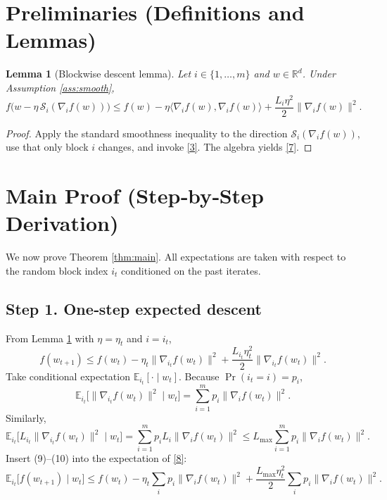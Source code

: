 \documentclass{article}
\newtheorem{lemma}{Lemma}
\begin{document}
\section*{Preliminaries (Definitions and Lemmas)}
\begin{lemma}[Blockwise descent lemma]\label{lem:descent}
Let $i\in\{1,\dots ,m\}$ and $w\in\mathbb{R}^{d}$.  Under Assumption \ref{ass:smooth},
\[
f\bigl(w-\eta\,\mathcal{S}_{i}(\nabla_i f(w))\bigr)
\le
f(w)-\eta\langle \nabla_i f(w),\nabla_i f(w)\rangle
+\frac{L_i\eta^{2}}{2}\|\nabla_i f(w)\|^{2}.
\tag{7}
\]
\end{lemma}
\begin{proof}
Apply the standard smoothness inequality to the direction $\mathcal{S}_{i}(\nabla_i f(w))$,
use that only block $i$ changes, and invoke \eqref{3}.  The algebra yields \eqref{7}.
\end{proof}

\section*{Main Proof (Step‑by‑Step Derivation)}
We now prove Theorem \ref{thm:main}.  All expectations are taken with respect to the random block index $i_t$ conditioned on the past iterates.

\subsection*{Step 1. One‑step expected descent}
From Lemma \ref{lem:descent} with $\eta=\eta_t$ and $i=i_t$,
\[
f(w_{t+1})\le f(w_t)-\eta_t\|\nabla_{i_t}f(w_t)\|^{2}
+\frac{L_{i_t}\eta_t^{2}}{2}\|\nabla_{i_t}f(w_t)\|^{2}.
\tag{8}
\]
Take conditional expectation $\mathbb{E}_{i_t}[\cdot\mid w_t]$.
Because $\Pr(i_t=i)=p_i$,
\[
\mathbb{E}_{i_t}\bigl[\|\nabla_{i_t}f(w_t)\|^{2}\mid w_t\bigr]
= \sum_{i=1}^{m}p_i\|\nabla_i f(w_t)\|^{2}.
\tag{9}
\]
Similarly,
\[
\mathbb{E}_{i_t}\bigl[L_{i_t}\|\nabla_{i_t}f(w_t)\|^{2}\mid w_t\bigr]
= \sum_{i=1}^{m}p_i L_i\|\nabla_i f(w_t)\|^{2}
\le L_{\max}\sum_{i=1}^{m}p_i\|\nabla_i f(w_t)\|^{2}.
\tag{10}
\]
Insert (9)–(10) into the expectation of \eqref{8}:
\[
\mathbb{E}_{i_t}\!\bigl[f(w_{t+1})\mid w_t\bigr]
\le
f(w_t)-\eta_t\!\sum_{i}p_i\|\nabla_i f(w_t)\|^{2}
+\frac{L_{\max}\eta_t^{2}}{2}\!\sum_{i}p_i\|\nabla_i f(w_t)\|^{2}.
\tag{11}
\]
\end{document}
